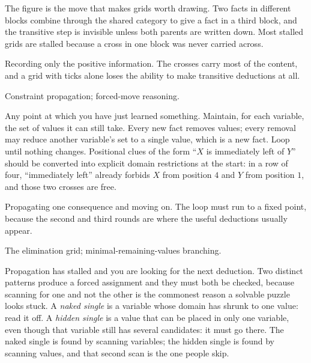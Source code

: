 The figure is the move that makes grids worth drawing. Two facts in different blocks combine through the shared category to give a fact in a third block, and the transitive step is invisible unless both parents are written down. Most stalled grids are stalled because a cross in one block was never carried across.

\begin{trap}
Recording only the positive information. The crosses carry most of the content, and a grid with ticks alone loses the ability to make transitive deductions at all.
\end{trap}

\begin{seealsob}Constraint propagation; forced-move reasoning.\end{seealsob}

\cue Any point at which you have just learned something.
\method Maintain, for each variable, the set of values it can still take. Every new fact removes values; every removal may reduce another variable's set to a single value, which is a new fact. Loop until nothing changes. Positional clues of the form ``$X$ is immediately left of $Y$'' should be converted into explicit domain restrictions at the start: in a row of four, ``immediately left'' already forbids $X$ from position $4$ and $Y$ from position $1$, and those two crosses are free.

\begin{trap}
Propagating one consequence and moving on. The loop must run to a fixed point, because the second and third rounds are where the useful deductions usually appear.
\end{trap}

\begin{seealsob}The elimination grid; minimal-remaining-values branching.\end{seealsob}

\cue Propagation has stalled and you are looking for the next deduction.
\method Two distinct patterns produce a forced assignment and they must both be checked, because scanning for one and not the other is the commonest reason a solvable puzzle looks stuck. A \emph{naked single} is a variable whose domain has shrunk to one value: read it off. A \emph{hidden single} is a value that can be placed in only one variable, even though that variable still has several candidates: it must go there. The naked single is found by scanning variables; the hidden single is found by scanning values, and that second scan is the one people skip.

